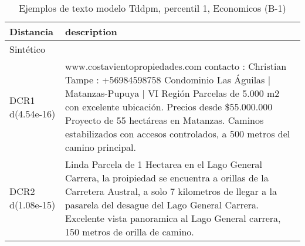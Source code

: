 \begin{table}[H]
\centering
\fontsize{10}{14}\selectfont
\caption{Ejemplos de texto modelo Tddpm, percentil 1, Economicos (B-1)}
\label{table-example-economicos-b-1-tddpm_mlp-1p-text}
\begin{tabular}{|l|m{35em}|}
\hline
\rowcolor[gray]{0.8}
Distancia & description \\
\hline Sintético &  \\
\hline DCR1 d(4.54e-16) & www.costavientopropiedades.com contacto : Christian Tampe : +56984598758  Condominio Las \'Aguilas | Matanzas-Pupuya | VI Regi\'on  Parcelas de 5.000 m2 con excelente ubicaci\'on. Precios desde \$55.000.000  Proyecto de 55 hect\'areas en Matanzas. Caminos estabilizados con accesos controlados, a 500 metros del camino principal. \\
\hline DCR2 d(1.08e-15) & Linda Parcela de 1 Hectarea en el Lago General Carrera, la proipiedad se encuentra a orillas de la Carretera Austral, a solo 7 kilometros de llegar a la pasarela del desague del Lago General Carrera.
Excelente vista panoramica al Lago General carrera, 150 metros de orilla de camino. \\
\hline
\end{tabular}
\end{table}
